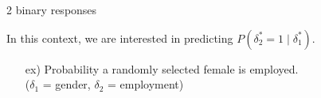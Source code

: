 \documentclass{beamer}
\begin{document}
\begin{frame}{2 binary responses}

In this context, we are interested in predicting $P(\delta^*_2=1 \mid \delta^*_1)$.
\begin{itemize}
\item[ex)] Probability a randomly selected female is employed. \\($\delta_1$ = gender, $\delta_2$ = employment)
\end{itemize}

\end{frame}
\end{document}

